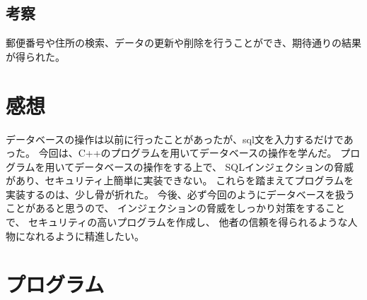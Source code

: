 \documentclass[a4j]{jarticle}
\begin{document}
\subsection{考察}
郵便番号や住所の検索、データの更新や削除を行うことができ、期待通りの結果が得られた。

\section{感想}
データベースの操作は以前に行ったことがあったが、sql文を入力するだけであった。
今回は、C++のプログラムを用いてデータベースの操作を学んだ。
プログラムを用いてデータベースの操作をする上で、
SQLインジェクションの脅威があり、セキュリティ上簡単に実装できない。
これらを踏まえてプログラムを実装するのは、少し骨が折れた。
今後、必ず今回のようにデータベースを扱うことがあると思うので、
インジェクションの脅威をしっかり対策をすることで、
セキュリティの高いプログラムを作成し、
他者の信頼を得られるような人物になれるように精進したい。


\section{プログラム}




\end{document}
